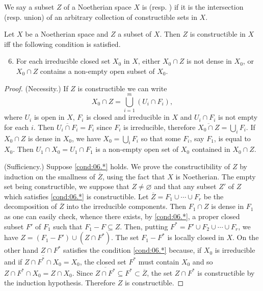\documentclass[../main]{subfiles}
\begin{document}
We say a subset $Z$ of a Noetherian space $X$ is  (resp. ) if it is the intersection (resp. union) of an arbitrary collection of constructible sets in $X$.

\begin{parproposition}\label{pro:06.01}
Let $X$ be a Noetherian space and $Z$ a subset of $X$. Then $Z$ is constructible in $X$ iff the following condition is satisfied.
\begin{enumerate}[label = (\arabic*.$\ast$)]\setcounter{enumi}{5}
\item\label{cond:06.*} For each irreducible closed set $X_0$ in $X$, either $X_0 \cap Z$ is not dense in $X_0$, or $X_0 \cap Z$ contains a non-empty open subset of $X_0$.

\end{enumerate}
\end{parproposition}

\begin{proof}
(Necessity.) If $Z$ is constructible we can write
\[
X_0 \cap Z = \bigcup_{i=1} ^m (U_i \cap F_i),
\]
where $U_i$ is open in $X$, $F_i$ is closed and irreducible in $X$ and $U_i \cap F_i$ is not empty for each $i$. Then $\overline{U_i \cap F_i} = F_i$ since $F_i$ is irreducible, therefore $\overline{X_0 \cap Z} = \bigcup_i F_i$. If $X_0 \cap Z$ is dense in $X_0$, we have $X_0 = \bigcup_i F_i$ so that some $F_i$, say $F_1$, is equal to $X_0$. Then $U_1 \cap X_0 = U_1 \cap F_1$ is a non-empty open set of $X_0$ contained in $X_0 \cap Z$.

(Sufficiency.) Suppose \ref{cond:06.*} holds. We prove the constructibility of $Z$ by induction on the smallness of $\overline{Z}$, using the fact that $X$ is Noetherian. The empty set being constructible, we suppose that $Z \ne \varnothing$ and that any subset $Z'$ of $Z$ which satisfies \ref{cond:06.*} is constructible. Let $\overline{Z} = F_1 \cup \cdots \cup F_r$ be the decomposition of $\overline{Z}$ into the irreducible components. Then $F_1 \cap Z$ is dense in $F_1$ as one can easily check, whence there exists, by \ref{cond:06.*}, a proper closed subset $F'$ of $F_1$ such that $F_1 - F \subseteq Z$. Then, putting $F^* = F' \cup F_2 \cup \cdots \cup F_r$, we have $Z= (F_1 - F') \cup (Z \cap F^*)$. The set $F_1 - F^*$ is locally closed in $X$. On the other hand $Z \cap F^*$ satisfies the condition \ref{cond:06.*} because, if $X_0$ is irreducible and if $\overline{Z \cap F^* \cap X_0} = X_0$, the closed set $F^*$ must contain $X_0$ and so $Z \cap F^* \cap X_0 = Z \cap X_0$. Since $\overline{Z \cap F^*} \subseteq F^* \subset \overline{Z}$, the set $Z \cap F^*$ is constructible by the induction hypothesis. Therefore $Z$ is constructible.
\end{proof}
\end{document}
